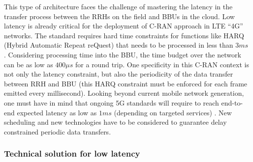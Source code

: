 \documentclass[a4paper,10pt]{article}
\begin{document}
This type of architecture faces the challenge of mastering the latency in the transfer process between the RRHs on the field and BBUs in the cloud. Low latency is already critical for the deployment of C-RAN approach in LTE “4G” networks. The standard requires hard time constraints for functions like HARQ (Hybrid Automatic Repeat reQuest) that needs to be processed in less than $3ms$ \cite{bouguen2012lte}. Considering processing time into the BBU, the time budget over the network can be as low as $400\mu s$ for a round trip. One specificity in this C-RAN context is not only the latency constraint, but also the periodicity of the data transfer between RRH and BBU (this HARQ constraint must be enforced for each frame emitted every millisecond). Looking beyond current mobile network generation, one must have in mind that ongoing 5G standards will require to reach end-to-end expected latency as low as $1ms$ (depending on targeted services) \cite{boccardi2014five}. New scheduling and new technologies have to be considered to guarantee delay constrained periodic data transfers. 


\subsubsection{Technical solution for low latency}
\end{document}
